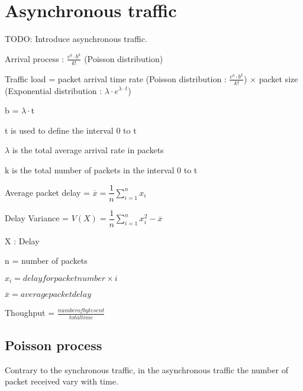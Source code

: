 \section{Asynchronous traffic}

TODO: Introduce asynchronous traffic.

\begin{description}
    \item Arrival process : $ \frac{e^{b} \cdot b^{k}}{k!}$ (Poisson distribution)
    \item Traffic load = packet arrival time rate  (Poisson distribution : $ \frac{e^{b} \cdot b^{k}}{k!}$) $\times$ packet size (Exponential distribution : $\lambda \cdot e^{ \lambda \cdot t}$)

	\begin{description}  
        \item b = $\lambda \cdot$t
        \item t is used to define the interval 0 to t   
        \item $\lambda$ is the total average arrival rate in packets
        \item k is the total number of packets in the interval 0 to t
   	\end{description}

    \item Average packet delay = $\overline{x} = \dfrac{1}{n} \sum_{i=1}^{n} x_{i}$
    \item Delay Variance = $ V(X) = \dfrac{1}{n} \sum_{i=1}^{n} x_{i}^{2} - \overline{x}$

    	\begin{description}
            \item X : Delay
            \item n = number of packets
            \item $x_{i} = delay for packet number \times i$
            \item $\overline{x} = average packet delay$
       	\end{description}

    \item Thoughput = $\frac{number of byte sent}{total time}$
\end{description}

\subsection{Poisson process}

Contrary to the synchronous traffic, in the asynchronous traffic the number of packet received vary with time. 

